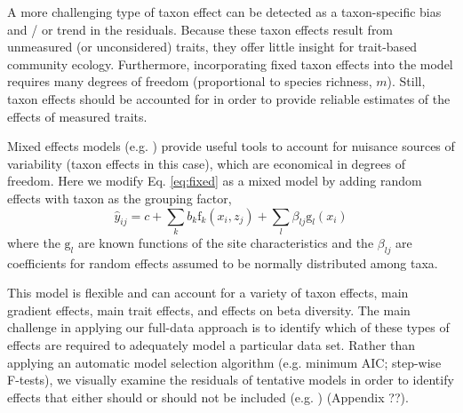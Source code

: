 \documentclass[12pt]{ecology}
\begin{document}
A more challenging type of taxon effect can be detected as a taxon-specific bias and / or trend in the residuals.  Because these taxon effects result from unmeasured (or unconsidered) traits, they offer little insight for trait-based community ecology.  Furthermore, incorporating fixed taxon effects into the model requires many degrees of freedom (proportional to species richness, $m$).  Still, taxon effects should be accounted for in order to provide reliable estimates of the effects of measured traits.

Mixed effects models (e.g. ) provide useful tools to account for nuisance sources of variability (taxon effects in this case), which are economical in degrees of freedom.  Here we modify Eq. \ref{eq:fixed} as a mixed model by adding random effects with taxon as the grouping factor,
\begin{equation}
\hat{y}_{ij} = c + 
	\sum_k b_k \mathrm{f}_k (x_i, z_j) + 
	\sum_l \beta_{lj} \mathrm{g}_l (x_i)
\end{equation}
where the $\mathrm{g}_l$ are known functions of the site characteristics and the $\beta_{lj}$ are coefficients for random effects assumed to be normally distributed among taxa.

This model is flexible and can account for a variety of taxon effects, main gradient effects, main trait effects, and effects on beta diversity.  The main challenge in applying our full-data approach is to identify which of these types of effects are required to adequately model a particular data set.  Rather than applying an automatic model selection algorithm (e.g. minimum AIC; step-wise F-tests), we visually examine the residuals of tentative models in order to identify effects that either should or should not be included (e.g. ) (Appendix ??).
\end{document}
